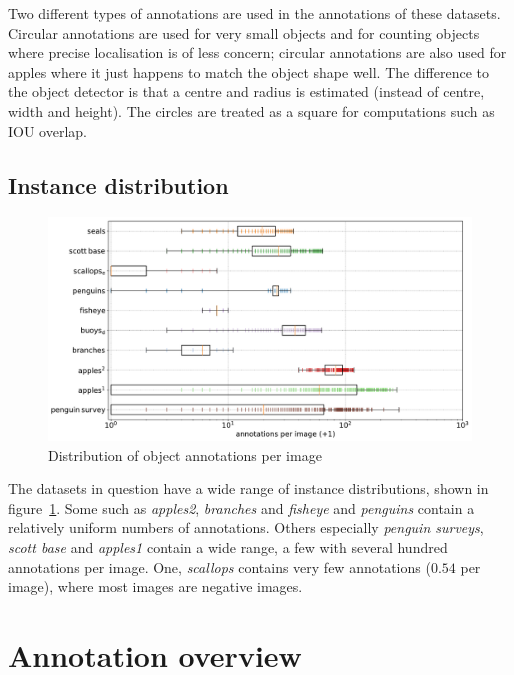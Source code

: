 Two different types of annotations are used in the annotations of these datasets. Circular annotations are used for very small objects and for counting objects where precise localisation is of less concern; circular annotations are also used for apples where it just happens to match the object shape well. The difference to the object detector is that a centre and radius is estimated (instead of centre, width and height). The circles are treated as a square for computations such as \gls{IOU} overlap.

\subsection {Instance distribution}

\begin{figure}[ht]
\centering
\includegraphics[width=1.0\linewidth]{charts/summaries/instances_boxplot.pdf}
\caption{ Distribution of object annotations per image }
\label{fig:instances_image_plot}
\end{figure}

The datasets in question have a wide range of instance distributions, shown in figure~\ref{fig:instances_image_plot}. Some such as \emph{apples2}, \emph{branches} and \emph{fisheye} and \emph{penguins} contain a relatively uniform numbers of annotations. Others especially \emph {penguin surveys}, \emph{scott base} and \emph{apples1} contain a wide range, a few with several hundred annotations per image. One, \emph{scallops} contains very few annotations ($0.54$ per image), where most images are negative images.

\section {Annotation overview}
\label{sec:annotation_overview}


